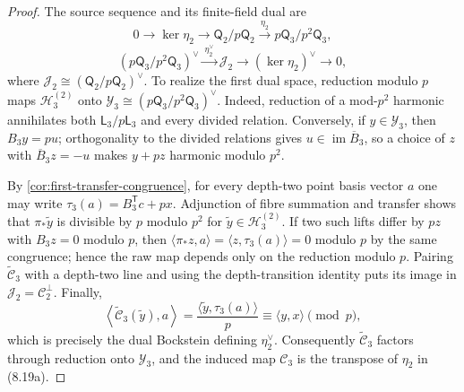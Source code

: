 \documentclass[12pt,a4paper]{article}
\theoremstyle{definition}
\newcommand{\LL}{\mathsf L}
\newcommand{\QQ}{\mathsf Q}
\newcommand{\im}{\operatorname{im}}
\newcommand{\transpose}{\mathsf T}
\begin{document}
\begin{proof}
The source sequence and its finite-field dual are
\[
 0\longrightarrow\ker\eta_2\longrightarrow\QQ_2/p\QQ_2
 \xrightarrow{\ \eta_2\ }p\QQ_3/p^2\QQ_3,
\]
\[
 (p\QQ_3/p^2\QQ_3)^\vee\xrightarrow{\ \eta_2^\vee\ }
 \mathcal J_2\longrightarrow(\ker\eta_2)^\vee\longrightarrow0,
\tag{8.19a}
\]
where $\mathcal J_2\cong(\QQ_2/p\QQ_2)^\vee$.  To realize the first
dual space, reduction modulo $p$ maps
$\mathscr H_3^{(2)}$ onto $\mathcal Y_3\cong
(p\QQ_3/p^2\QQ_3)^\vee$.  Indeed, reduction of a mod-$p^2$ harmonic
annihilates both $\LL_3/p\LL_3$ and every divided relation.  Conversely,
if $y\in\mathcal Y_3$, then $B_3y=pu$; orthogonality to the divided
relations gives $u\in\im\overline B_3$, so a choice of
$z$ with $\overline B_3z=-u$ makes $y+pz$ harmonic modulo $p^2$.

By \cref{cor:first-transfer-congruence}, for every depth-two point basis
vector $a$ one may write $\tau_3(a)=B_3^\transpose c+px$.  Adjunction of
fibre summation and transfer shows that $\pi_*\widetilde y$ is divisible by
$p$ modulo $p^2$ for $\widetilde y\in\mathscr H_3^{(2)}$.  If two such
lifts differ by $pz$ with $B_3z=0$ modulo $p$, then
$\langle\pi_*z,a\rangle=\langle z,\tau_3(a)\rangle=0$ modulo $p$ by the
same congruence; hence the raw map depends only on the reduction modulo
$p$.  Pairing $\widetilde{\mathcal C}_3$ with a depth-two line and using
the depth-transition identity puts its image in
$\mathcal J_2=\mathcal C_2^\perp$.  Finally,
\[
\left\langle\widetilde{\mathcal C}_3(\widetilde y),a\right\rangle
 =\frac{\langle\widetilde y,\tau_3(a)\rangle}{p}
 \equiv\langle y,x\rangle\pmod p,
\]
which is precisely the dual Bockstein defining $\eta_2^\vee$.
Consequently $\widetilde{\mathcal C}_3$ factors through reduction onto
$\mathcal Y_3$, and the induced map $\mathcal C_3$ is the transpose of
$\eta_2$ in (8.19a).


\end{proof}
\end{document}
